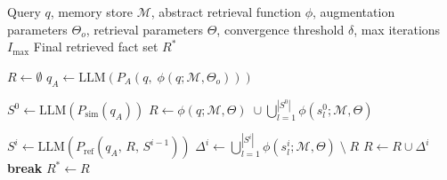\begin{algorithm}[t]
\caption{Prospection-Guided Retrieval (PGR)}
\label{alg:pgr}
\begin{algorithmic}[1]
\Require Query $q$, memory store $\mathcal{M}$, abstract retrieval function $\phi$, augmentation parameters $\Theta_o$, retrieval parameters $\Theta$, convergence threshold $\delta$, max iterations $I_{\max}$
\Ensure Final retrieved fact set $R^*$

\State $R \leftarrow \emptyset$
\State {}
\State $q_A \leftarrow \mathrm{LLM}(P_A(q,\; \phi(q;\mathcal{M}, \Theta_o)))$

\State {}
\State $S^0 \leftarrow \mathrm{LLM}(P_{\mathrm{sim}}(q_A))$
\State $R \leftarrow \phi(q;\mathcal{M}, \Theta) \;\cup \displaystyle\bigcup_{l=1}^{|S^0|} \phi(s^0_l;\mathcal{M}, \Theta)$

\State {}
    \State $S^i \leftarrow \mathrm{LLM}(P_{\mathrm{ref}}(q_A,\, R,\, S^{i-1}))$
    \State $\Delta^i \leftarrow \displaystyle\bigcup_{l=1}^{|S^i|} \phi(s^i_l;\mathcal{M}, \Theta) \;\setminus\; R$
    \State $R \leftarrow R \cup \Delta^i$
     \textbf{break} \EndIf
\EndFor
\State \Return $R^* \leftarrow R$
\end{algorithmic}
\end{algorithm}
